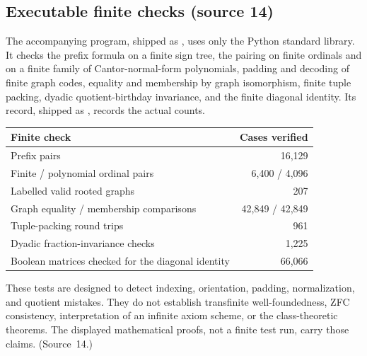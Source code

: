 \documentclass[11pt,letterpaper]{article}
\theoremstyle{definition}
\theoremstyle{remark}
\begin{document}
\subsection{Executable finite checks (source 14)}
\label{hset:sf:sub:checks}

The accompanying program, shipped as
, uses only the Python standard
library. It checks the prefix formula on a finite sign tree, the pairing on finite
ordinals and on a finite family of Cantor-normal-form polynomials, padding and
decoding of finite graph codes, equality and membership by graph isomorphism, finite
tuple packing, dyadic quotient-birthday invariance, and the finite diagonal
identity. Its record, shipped as ,
records the actual counts.

\begin{center}\small
\begin{tabular}{@{}lr@{}}
\toprule
Finite check & Cases verified\\
\midrule
Prefix pairs & 16,129\\
Finite / polynomial ordinal pairs & 6,400 / 4,096\\
Labelled valid rooted graphs & 207\\
Graph equality / membership comparisons & 42,849 / 42,849\\
Tuple-packing round trips & 961\\
Dyadic fraction-invariance checks & 1,225\\
Boolean matrices checked for the diagonal identity & 66,066\\
\bottomrule
\end{tabular}
\end{center}

These tests are designed to detect indexing, orientation, padding, normalization,
and quotient mistakes. They do not establish transfinite well-foundedness, ZFC
consistency, interpretation of an infinite axiom scheme, or the class-theoretic
theorems. The displayed mathematical proofs, not a finite test run, carry those
claims. (Source~14.)

\end{document}
